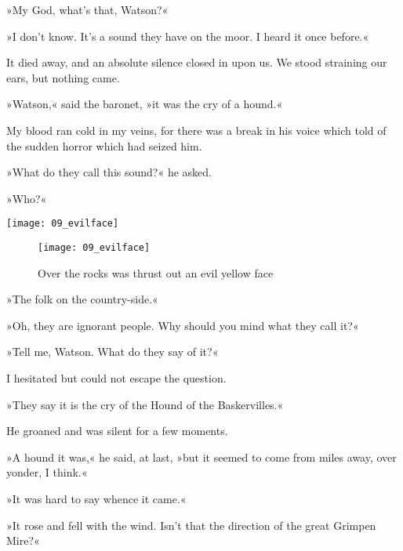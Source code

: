 »My God, what's that, Watson?«

»I don't know. It's a sound they have on the moor. I heard it once before.«

It died away, and an absolute silence closed in upon us. We stood straining our ears, but nothing came.

»Watson,« said the baronet, »it was the cry of a hound.«

My blood ran cold in my veins, for there was a break in his voice which told of the sudden horror which had seized him.

»What do they call this sound?« he asked.

»Who?«

\makeatletter
{}
{%
\begin{center}
	\texttt{[image: 09\_evilface]}
\end{center}
\thispagestyle{empty}
\clearpage
}{%

}

\makeatother


\makeatletter
{}
{%

}{%
	\begin{figure}[h!]
	\centering
	\texttt{[image: 09\_evilface]}
	\caption{Over the rocks was thrust out an evil yellow face}
	\end{figure}
}

\makeatother

»The folk on the country-side.«

»Oh, they are ignorant people. Why should you mind what they call it?«

 
»Tell me, Watson. What do they say of it?«

I hesitated but could not escape the question.

»They say it is the cry of the Hound of the Baskervilles.«

He groaned and was silent for a few moments.

»A hound it was,« he said, at last, »but it seemed to come from miles away, over yonder, I think.«

»It was hard to say whence it came.«

»It rose and fell with the wind. Isn't that the direction of the great Grimpen Mire?«

